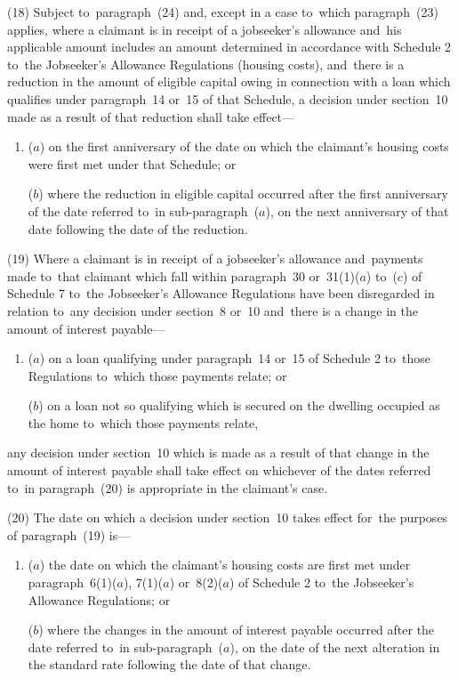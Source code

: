 \documentclass[12pt,a4paper]{article}
\begin{document}
(18) Subject to~paragraph~(24) and, except in a case to~which paragraph~(23) applies, where a claimant is in receipt of a jobseeker’s allowance and~his applicable amount includes an amount determined in accordance with Schedule 2 to~the Jobseeker’s Allowance Regulations (housing costs), and~there is a reduction in the amount of eligible capital owing in connection with a loan which qualifies under paragraph~14 or~15 of that Schedule, a decision under section~10 made as a result of that reduction shall take effect—
\begin{enumerate}\item[]
($a$) on the first anniversary of the date on which the claimant’s housing costs were first met under that Schedule; or

($b$) where the reduction in eligible capital occurred after the first anniversary of the date referred to~in sub-paragraph~($a$), on the next anniversary of that date following the date of the reduction.
\end{enumerate}

(19) Where a claimant is in receipt of a jobseeker’s allowance and~payments made to~that claimant which fall within paragraph~30 or~31(1)($a$) to~($c$) of Schedule 7 to~the Jobseeker’s Allowance Regulations have been disregarded in relation to~any decision under section~8 or~10 and~there is a change in the amount of interest payable—
\begin{enumerate}\item[]
($a$) on a loan qualifying under paragraph~14 or~15 of Schedule 2 to~those Regulations to~which those payments relate; or

($b$) on a loan not so qualifying which is secured on the dwelling occupied as the home to~which those payments relate,
\end{enumerate}
any decision under section~10 which is made as a result of that change in the amount of interest payable shall take effect on whichever of the dates referred to~in paragraph~(20) is appropriate in the claimant’s case.

(20) The date on which a decision under section~10 takes effect for~the purposes of paragraph~(19) is—
\begin{enumerate}\item[]
($a$) the date on which the claimant’s housing costs are first met under paragraph~6(1)($a$), 7(1)($a$) or~8(2)($a$) of Schedule 2 to~the Jobseeker’s Allowance Regulations; or

($b$) where the changes in the amount of interest payable occurred after the date referred to~in sub-paragraph~($a$), on the date of the next alteration in the standard rate following the date of that change.
\end{enumerate}
\end{document}
